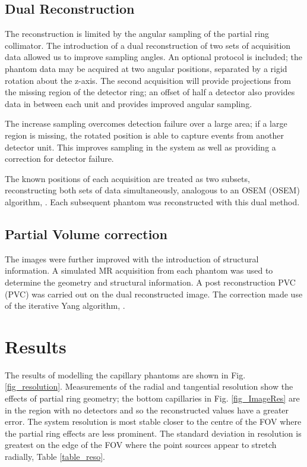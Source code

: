 \subsection{Dual Reconstruction}
The reconstruction is limited by the angular sampling of the partial ring collimator. The introduction of a dual reconstruction of two sets of acquisition data allowed us to improve sampling angles. An optional protocol is included; the phantom data may be acquired at two angular positions, separated by a rigid rotation about the z-axis. The second acquisition will provide projections from the missing region of the detector ring; an offset of half a detector also provides data in between each unit and provides improved angular sampling. 

The increase sampling overcomes detection failure over a large area; if a large region is missing, the rotated position is able to capture events from another detector unit. This improves sampling in the system as well as providing a correction for detector failure.

The known positions of each acquisition are treated as two subsets, reconstructing both sets of data simultaneously, analogous to an \acrlong{OSEM} (\acrshort{OSEM}) algorithm, \cite{363108}. Each subsequent phantom was reconstructed with this dual method.

\subsection{Partial Volume correction} 
The images were further improved with the introduction of structural information. A simulated \acrshort{MR} acquisition from each phantom was used to determine the geometry and structural information. A post reconstruction \acrlong{PVC} (\acrshort{PVC}) was carried out on the dual reconstructed image. The correction made use of the iterative Yang algorithm, \cite{Erlandsson_2012}.

\section{Results}
  The results of modelling the capillary phantoms are shown in Fig. \ref{fig_resolution}. Measurements of the radial and tangential resolution show the effects of partial ring geometry; the bottom capillaries in Fig. \ref{fig_ImageRes} are in the region with no detectors and so the reconstructed values have a greater error. The system resolution is most stable closer to the centre of the \acrshort{FOV} where the partial ring effects are less prominent. The standard deviation in resolution is greatest on the edge of the FOV where the point sources appear to stretch radially, Table \ref{table_reso}.
  
